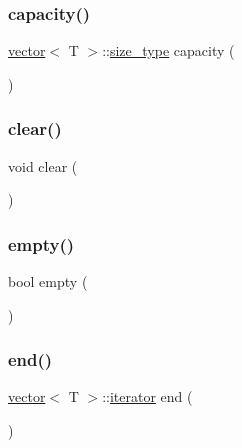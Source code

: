 \subsubsection{\texorpdfstring{capacity()}{capacity()}}
{\footnotesize\ttfamily \mbox{\hyperlink{classvector}{vector}}$<$ T $>$\+::\mbox{\hyperlink{classvector_ada51e68d31936547d3729c82daf6b7c6}{size\+\_\+type}} capacity (\begin{DoxyParamCaption}{ }\end{DoxyParamCaption})}

\mbox{\label{classvector_ac8bb3912a3ce86b15842e79d0b421204}} 
\subsubsection{\texorpdfstring{clear()}{clear()}}
{\footnotesize\ttfamily void clear (\begin{DoxyParamCaption}{ }\end{DoxyParamCaption})}

\mbox{\label{classvector_a3f37b042a1e7cd4bd38fc564de81f0da}} 
\subsubsection{\texorpdfstring{empty()}{empty()}}
{\footnotesize\ttfamily bool empty (\begin{DoxyParamCaption}{ }\end{DoxyParamCaption})}

\mbox{\label{classvector_a917b71a963fdd2726699c125a49c6864}} 
\subsubsection{\texorpdfstring{end()}{end()}}
{\footnotesize\ttfamily \mbox{\hyperlink{classvector}{vector}}$<$ T $>$\+::\mbox{\hyperlink{classvector_a35c955cacac6aacaa1e82874b1628865}{iterator}} end (\begin{DoxyParamCaption}{ }\end{DoxyParamCaption})}

\mbox{\label{classvector_a29790c28710ec0e64b48c2f4edd0b08c}} 
